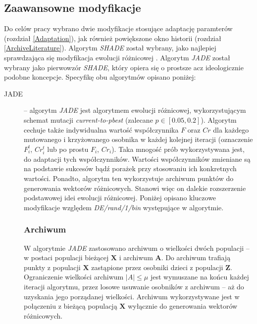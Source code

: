\documentclass[12pt,a4paper]{report}
\begin{document}
{{{\subsection{Zaawansowne modyfikacje}
\par{
Do celów pracy wybrano dwie modyfikacje stosujące adaptację paramterów (rozdział \ref{Adaptation}), jak również powiększone okno historii (rozdział \ref{ArchiveLiterature}). Algorytm \emph{SHADE} \cite{SHADE} został wybrany, jako najlepiej sprawdzająca się modyfikacja ewolucji różnicowej \cite{CEC2013Comp}. Algorytm \emph{JADE} \cite{JADE} został wybrany jako pierwowzór \emph{SHADE}, który opiera się o prostsze acz ideologicznie podobne koncepcje. Specyfikę obu algorytmów opisano poniżej:
}
\begin{description}
\item[JADE] \cite{JADE} -- algorytm \emph{JADE} jest algorytmem ewolucji różnicowej, wykorzystującym schemat mutacji \emph{current-to-pbest} (zalecane $p \in [0.05, 0.2]$). Algorytm cechuje także indywidualna wartość współczynnika $F$ oraz $Cr$ dla każdego mutowanego i krzyżowanego osobnika w każdej kolejnej iteracji (oznaczenie $F_i^t$, $Cr_i^t$ lub po prostu $F_i$, $Cr_i$). Taka mnogość prób wykorzystywana jest, do adaptacji tych współczynników. Wartości współczynników zmieniane są na podstawie sukcesów bądź porażek przy stosowaniu ich konkretnych wartości. Ponadto, algorytm ten wykorzystuje archiwum punktów do generowania wektorów różnicowych. Stanowi więc on dalekie rozszerzenie podstawowej idei ewolucji różnicowej. Poniżej opisano kluczowe modyfikacje względem \emph{DE/rand/1/bin} występujące w algorytmie.
\subsubsection{Archiwum}
\par{
W algorytmie \emph{JADE} zastosowano archiwum o wielkości dwóch populacji -- w postaci populacji bieżącej $\mathbf{X}$ i archiwum $\mathbf{A}$. Do archiwum trafiają punkty z populacji $\mathbf{X}$ zastąpione przez osobniki dzieci z populacji $\mathbf{Z}$. Ograniczenie wielkości archiwum $|A| \le \mu$ jest wymuszane na końcu każdej iteracji algorytmu, przez losowe usuwanie osobników z archiwum -- aż do uzyskania jego porządanej wielkości. Archiwum wykorzystywane jest w połączeniu z bieżącą populacją $\mathbf{X}$ wyłącznie do generowania wektorów różnicowych.
}

\end{description}}}}
\end{document}
